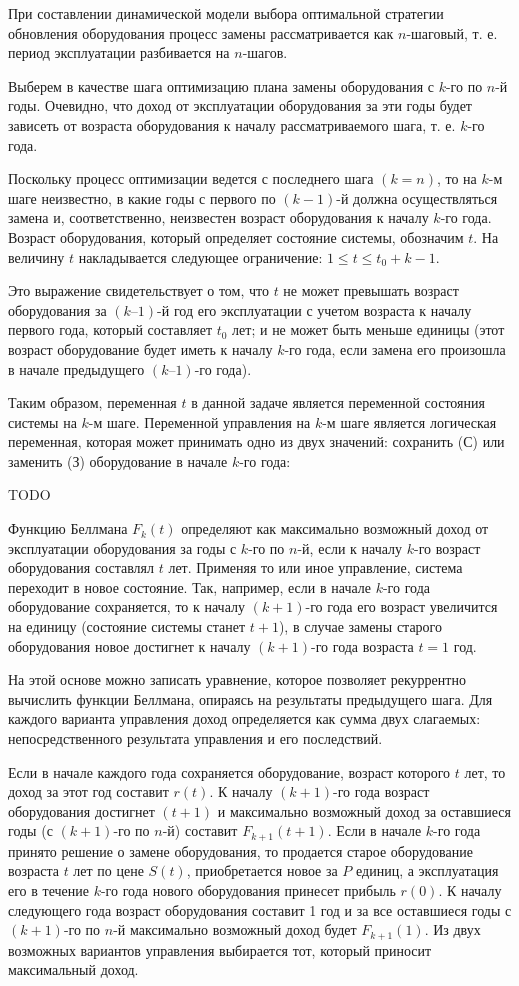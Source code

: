 При составлении динамической модели выбора оптимальной стратегии обновления оборудования процесс замены рассматривается как $n$-шаговый, т. е. период эксплуатации разбивается на $n$-шагов.

Выберем в качестве шага оптимизацию плана замены оборудования с $k$-го по $n$-й годы. Очевидно, что доход от эксплуатации оборудования за эти годы будет зависеть от возраста оборудования к началу рассматриваемого шага, т. е. $k$-го года.

Поскольку процесс оптимизации ведется с последнего шага $(k = n)$, то на $k$-м шаге неизвестно, в какие годы с первого по $(k-1)$-й должна осуществляться замена и, соответственно, неизвестен возраст оборудования к началу $k$-го года. Возраст оборудования, который определяет состояние системы, обозначим $t$. На величину $t$ накладывается следующее ограничение: $1 \leq t \leq t_0 + k - 1$.

Это выражение свидетельствует о том, что $t$ не может превышать возраст оборудования за $(k–1)$-й год его эксплуатации с учетом возраста к началу первого года, который составляет $t_0$ лет; и не может быть меньше единицы (этот возраст оборудование будет иметь к началу $k$-го года, если замена его произошла в начале предыдущего $(k–1)$-го года).

Таким образом, переменная $t$ в данной задаче является переменной состояния системы на $k$-м шаге. Переменной управления на $k$-м шаге является логическая переменная, которая может принимать одно из двух значений: сохранить (С) или заменить (З) оборудование в начале $k$-го года:

TODO

Функцию Беллмана $F_k(t)$ определяют как максимально возможный доход от эксплуатации оборудования за годы с $k$-го по $n$-й, если к началу $k$-го возраст оборудования составлял $t$ лет. Применяя то или иное управление, система переходит в новое состояние. Так, например, если в начале $k$-го года оборудование сохраняется, то к началу $(k + 1)$-го года его возраст увеличится на единицу (состояние системы станет $t+1$), в случае замены старого оборудования новое достигнет к началу $(k + 1)$-го года возраста $t = 1$ год.

На этой основе можно записать уравнение, которое позволяет рекуррентно вычислить функции Беллмана, опираясь на результаты предыдущего шага. Для каждого варианта управления доход определяется как сумма двух слагаемых: непосредственного результата управления и его последствий.

Если в начале каждого года сохраняется оборудование, возраст которого $t$ лет, то доход за этот год составит $r(t)$. К началу $(k+1)$-го года возраст оборудования достигнет $(t+1)$ и максимально возможный доход за оставшиеся годы (с $(k+1)$-го по $n$-й) составит $F_{k+1}(t+1)$. Если в начале $k$-го года принято решение о замене оборудования, то продается старое оборудование возраста $t$ лет по цене $S(t)$, приобретается новое за $P$ единиц, а эксплуатация его в течение $k$-го года нового оборудования принесет прибыль $r(0)$. К началу следующего года возраст оборудования составит 1 год и за все оставшиеся годы с $(k+1)$-го по $n$-й максимально возможный доход будет $F_{k+1}(1)$. Из двух возможных вариантов управления выбирается тот, который приносит максимальный доход.

